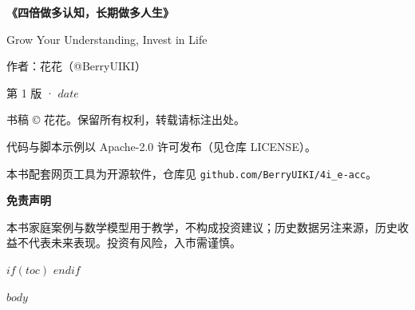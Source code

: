 \documentclass[b5paper,11pt,oneside,fontset=none,UTF8]{ctexbook}
\begin{document}
\thispagestyle{empty}
\begingroup
\small\color{dh-navy-soft}
\setlength{\parindent}{0pt}
\vspace*{\fill}

{\color{dh-navy}\bfseries\large 《四倍做多认知，长期做多人生》\par}
\vspace{0.15em}
{\color{dh-bronze} Grow Your Understanding, Invest in Life\par}
\vspace{0.6em}
作者：花花（@BerryUIKI）\par
第 1 版 · $date$ \par
\vspace{0.9em}

书稿 © 花花。保留所有权利，转载请标注出处。\par
代码与脚本示例以 Apache-2.0 许可发布（见仓库 LICENSE）。\par
本书配套网页工具为开源软件，仓库见 \texttt{github.com/BerryUIKI/4i\_e-acc}。\par
\vspace{0.9em}

{\color{dh-bronze}\textbf{免责声明}}\par
\vspace{0.2em}
本书家庭案例与数学模型用于教学，不构成投资建议；历史数据另注来源，历史收益不代表未来表现。投资有风险，入市需谨慎。\par

\vspace*{\fill}
\endgroup
\clearpage

\frontmatter

$if(toc)$
\begingroup
\fontsize{10.5pt}{14.5pt}\selectfont
\tableofcontents
\endgroup
$endif$

$body$
\end{document}
